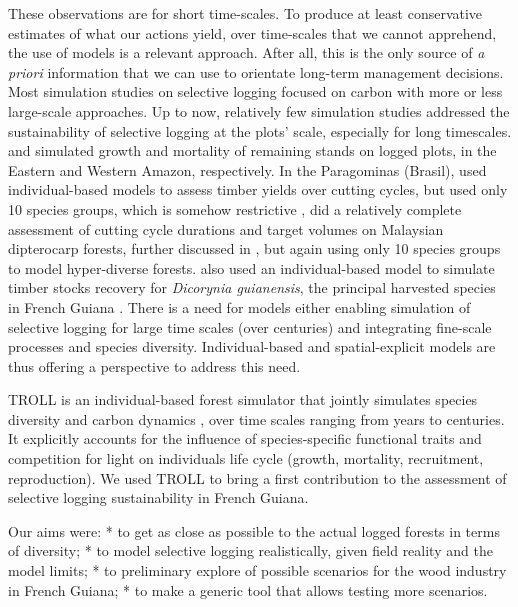 \documentclass[12pt,]{article}
\theoremstyle{definition}
\theoremstyle{definition}
\theoremstyle{definition}
\theoremstyle{remark}
\begin{document}
These observations are for short time-scales. To produce at least
conservative estimates of what our actions yield, over time-scales that
we cannot apprehend, the use of models is a relevant approach. After
all, this is the only source of \emph{a priori} information that we can
use to orientate long-term management decisions. Most simulation studies
on selective logging focused on carbon
\citep{Piponiot2016, Rutishauser2015, Huang2008} with more or less
large-scale approaches. Up to now, relatively few simulation studies
addressed the sustainability of selective logging at the plots' scale,
especially for long timescales. \citet{Sist2007} and \citet{Dauber2005}
simulated growth and mortality of remaining stands on logged plots, in
the Eastern and Western Amazon, respectively. In the Paragominas
(Brasil), \citet{Valle2007} used individual-based models to assess
timber yields over cutting cycles, but used only 10 species groups,
which is somehow restrictive \citep[see][]{Marechaux2017}
\citet{Huth2001}, did a relatively complete assessment of cutting cycle
durations and target volumes on Malaysian dipterocarp forests, further
discussed in \citet{Huth2003}, but again using only 10 species groups to
model hyper-diverse forests. \citet{Gourlet-Fleury2005a} also used an
individual-based model to simulate timber stocks recovery for
\emph{Dicorynia guianensis}, the principal harvested species in French
Guiana \citep{Guitet2011}. There is a need for models either enabling
simulation of selective logging for large time scales (over centuries)
and integrating fine-scale processes and species diversity.
Individual-based and spatial-explicit models are thus offering a
perspective to address this need.

TROLL is an individual-based forest simulator that jointly simulates
species diversity and carbon dynamics \citep{Marechaux2017a}, over time
scales ranging from years to centuries. It explicitly accounts for the
influence of species-specific functional traits and competition for
light on individuals life cycle (growth, mortality, recruitment,
reproduction). We used TROLL to bring a first contribution to the
assessment of selective logging sustainability in French Guiana.

Our aims were: * to get as close as possible to the actual logged
forests in terms of diversity; * to model selective logging
realistically, given field reality and the model limits; * to
preliminary explore of possible scenarios for the wood industry in
French Guiana; * to make a generic tool that allows testing more
scenarios.
\end{document}
